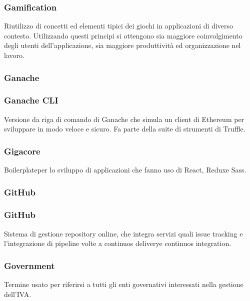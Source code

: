 \subsubsection*{Gamification}
Riutilizzo di concetti ed elementi tipici dei giochi in applicazioni di diverso contesto. Utilizzando questi principi si ottengono sia maggiore coinvolgimento degli utenti dell'applicazione, sia maggiore produttività ed organizzazione nel lavoro.

\subsubsection*{Ganache}

\subsubsection*{Ganache CLI}
Versione da riga di comando di Ganache che simula un client di Ethereum per sviluppare in modo veloce e sicuro. Fa parte della suite di strumenti di Truffle\glo.


\subsubsection*{Gigacore}
Boilerplate\glosp per lo sviluppo di applicazioni che fanno uso di React\glo, Redux\glosp e Sass\glo.

\subsubsection*{GitHub}

\subsubsection*{GitHub}
Sistema di gestione repository online, che integra servizi quali issue tracking e l'integrazione di pipeline volte a continuos delivery\glosp e continuos integration\glo.



\subsubsection*{Government}
Termine usato per riferirsi a tutti gli enti governativi interessati nella gestione dell'IVA.


